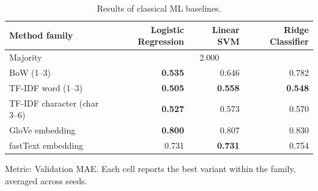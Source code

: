 \begin{table}[htbp]
\centering
\scriptsize
\setlength{\tabcolsep}{3pt}
\caption{Results of classical ML baselines.}
\label{tab:classic-baselines-no-variance}
\begin{tabular}{lrrr}
\toprule
Method family & Logistic Regression & Linear SVM & Ridge Classifier \\
\midrule
Majority & \multicolumn{3}{c}{2.000} \\
BoW (1--3) & \textbf{0.535} & 0.646 & 0.782 \\
TF-IDF word (1--3) & \textbf{0.505} & \textbf{0.558} & \textbf{0.548} \\
TF-IDF character (char 3--6) & \textbf{0.527} & 0.573 & 0.570 \\
GloVe embedding & \textbf{0.800} & 0.807 & 0.830 \\
fastText embedding & 0.731 & \textbf{0.731} & 0.754 \\
\bottomrule
\end{tabular}
\par\smallskip\footnotesize Metric: Validation MAE. Each cell reports the best variant within the family, averaged across seeds.
\end{table}
